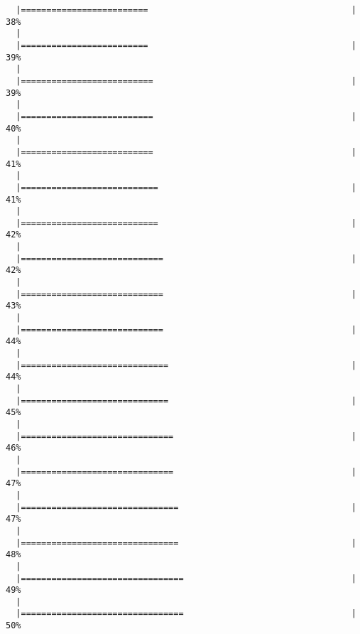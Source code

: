 \begin{knitrout}
\begin{kframe}
\begin{verbatim}
  |=========================                                        |  38%
  |                                                                       
  |=========================                                        |  39%
  |                                                                       
  |==========================                                       |  39%
  |                                                                       
  |==========================                                       |  40%
  |                                                                       
  |==========================                                       |  41%
  |                                                                       
  |===========================                                      |  41%
  |                                                                       
  |===========================                                      |  42%
  |                                                                       
  |============================                                     |  42%
  |                                                                       
  |============================                                     |  43%
  |                                                                       
  |============================                                     |  44%
  |                                                                       
  |=============================                                    |  44%
  |                                                                       
  |=============================                                    |  45%
  |                                                                       
  |==============================                                   |  46%
  |                                                                       
  |==============================                                   |  47%
  |                                                                       
  |===============================                                  |  47%
  |                                                                       
  |===============================                                  |  48%
  |                                                                       
  |================================                                 |  49%
  |                                                                       
  |================================                                 |  50%

\end{verbatim}
\end{kframe}
\end{knitrout}
